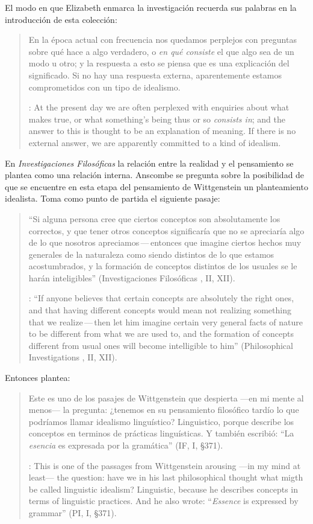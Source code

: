 El modo en que Elizabeth enmarca la investigación recuerda sus palabras en la introducción de esta colección: \blockquote[{\cite[xi]{anscombe1981parmenides}}: At the present day we are often perplexed with enquiries about what makes true, or what something's being thus or so \emph{consists in}; and the answer to this is thought to be an explanation of meaning. If there is no external answer, we are apparently committed to a kind of idealism.]{En la época actual con frecuencia nos quedamos perplejos con preguntas sobre qué hace a algo verdadero, o \emph{en qué consiste} el que algo sea de un modo u otro; y la respuesta a esto se piensa que es una explicación del significado. Si no hay una respuesta externa, aparentemente estamos comprometidos con un tipo de idealismo.} En \emph{Investigaciones Filosóficas} la relación entre la realidad y el pensamiento se plantea como una relación interna. Anscombe se pregunta sobre la posibilidad de que se encuentre en esta etapa del pensamiento de Wittgenstein un planteamiento idealista. Toma como punto de partida el siguiente pasaje: \blockquote[{\cite[112]{anscombe1981parmenides:qli}}: ``If anyone believes that certain concepts are absolutely the right ones, and that having different concepts would mean not realizing something that we realize\,---\,then let him imagine certain very general facts of nature to be different from what we are used to, and the formation of  concepts different from usual ones will become intelligible to him'' (Philosophical Investigations , II, XII).]{``Si alguna persona cree que ciertos conceptos son absolutamente los correctos, y que tener otros conceptos significaría que no se apreciaría algo de lo que nosotros apreciamos\,---\,entonces que imagine ciertos hechos muy generales de la naturaleza como siendo distintos de lo que estamos acostumbrados, y la formación de conceptos distintos de los usuales se le harán inteligibles'' (Investigaciones Filosóficas , II, XII).} Entonces plantea: \blockquote[{\cite[112]{anscombe1981parmenides:qli}}: This is one of the passages from Wittgenstein arousing ---in my mind at least--- the question: have we in his last philosophical thought what migth be called linguistic idealism? Linguistic, because he describes concepts in terms of linguistic practices. And he also wrote: ``\emph{Essence} is expressed by grammar'' (PI, I, \S371).]{Este es uno de los pasajes de Wittgenstein que despierta ---en mi mente al menos--- la pregunta: ¿tenemos en su pensamiento filosófico tardío lo que podríamos llamar idealismo linguístico? Linguistico, porque describe los conceptos en terminos de prácticas linguísticas. Y también escribió: ``La \emph{esencia} es expresada por la gramática'' (IF, I, \S371).}

